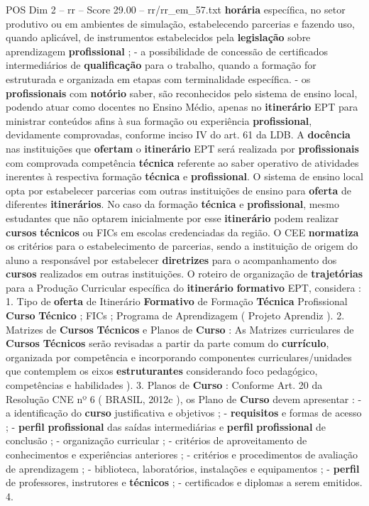 \begin{textsample}{POS Dim 2 – rr – Score 29.00 – rr/rr\_em\_57.txt}
\textbf{horária} específica, no setor produtivo ou em ambientes de simulação, estabelecendo parcerias e fazendo uso, quando aplicável, de instrumentos estabelecidos pela \textbf{legislação} sobre aprendizagem \textbf{profissional} ; - a possibilidade de concessão de certificados intermediários de \textbf{qualificação} para o trabalho, quando a formação for estruturada e organizada em etapas com terminalidade específica. - os \textbf{profissionais} com \textbf{notório} saber, são reconhecidos pelo sistema de ensino local, podendo atuar como docentes no Ensino Médio, apenas no \textbf{itinerário} EPT para ministrar conteúdos afins à sua formação ou experiência \textbf{profissional}, devidamente comprovadas, conforme inciso IV do art. 61 da LDB.
A \textbf{docência} nas instituições que \textbf{ofertam} o \textbf{itinerário} EPT será realizada por \textbf{profissionais} com comprovada competência \textbf{técnica} referente ao saber operativo de atividades inerentes à respectiva formação \textbf{técnica} e \textbf{profissional}.
O sistema de ensino local opta por estabelecer parcerias com outras instituições de ensino para \textbf{oferta} de diferentes \textbf{itinerários}.
No caso da formação \textbf{técnica} e \textbf{profissional}, mesmo estudantes que não optarem inicialmente por esse \textbf{itinerário} podem realizar \textbf{cursos} \textbf{técnicos} ou FICs em escolas credenciadas da região.
O CEE \textbf{normatiza} os critérios para o estabelecimento de parcerias, sendo a instituição de origem do aluno a responsável por estabelecer \textbf{diretrizes} para o acompanhamento dos \textbf{cursos} realizados em outras instituições.
O roteiro de organização de \textbf{trajetórias} para a Produção Curricular específica do \textbf{itinerário} \textbf{formativo} EPT, considera : 1.
Tipo de \textbf{oferta} de Itinerário \textbf{Formativo} de Formação \textbf{Técnica} Profissional \textbf{Curso} \textbf{Técnico} ; FICs ; Programa de Aprendizagem ( Projeto Aprendiz ). 2.
Matrizes de \textbf{Cursos} \textbf{Técnicos} e Planos de \textbf{Curso} : As Matrizes curriculares de \textbf{Cursos} \textbf{Técnicos} serão revisadas a partir da parte comum do \textbf{currículo}, organizada por competência e incorporando componentes curriculares/unidades que contemplem os eixos \textbf{estruturantes} considerando foco pedagógico, competências e habilidades ). 3.
Planos de \textbf{Curso} : Conforme Art. 20 da Resolução CNE nº 6 ( BRASIL, 2012c ), os Plano de \textbf{Curso} devem apresentar : - a identificação do \textbf{curso} justificativa e objetivos ; - \textbf{requisitos} e formas de acesso ; - \textbf{perfil} \textbf{profissional} das saídas intermediárias e \textbf{perfil} \textbf{profissional} de conclusão ; - organização curricular ; - critérios de aproveitamento de conhecimentos e experiências anteriores ; - critérios e procedimentos de avaliação de aprendizagem ; - biblioteca, laboratórios, instalações e equipamentos ; - \textbf{perfil} de professores, instrutores e \textbf{técnicos} ; - certificados e diplomas a serem emitidos. 4.

\end{textsample}
